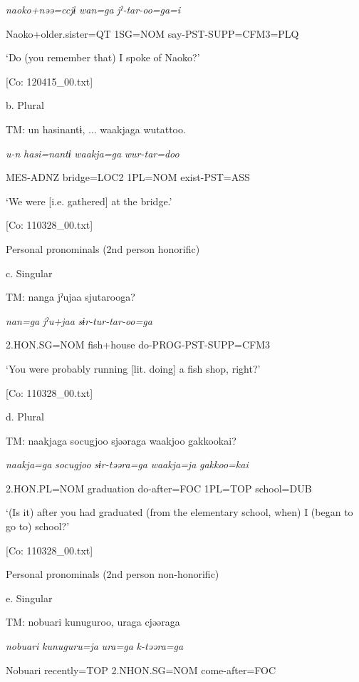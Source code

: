       \textit{naoko+nəə=ccjɨ}  \textit{wan=ga}  \textit{jˀ-tar-oo=ga=i}

      Naoko+older.sister=QT  1SG=NOM  say-PST-SUPP=CFM3=PLQ

      ‘Do (you remember that) I spoke of Naoko?’

      [Co: 120415\_00.txt]

  b.  Plural

    TM:  un  hasinantɨ, ...  waakjaga  wutattoo.

      \textit{u-n}  \textit{hasi=nantɨ}  \textit{waakja=ga}  \textit{wur-tar=doo}

      MES-ADNZ  bridge=LOC2  1PL=NOM  exist-PST=ASS

      ‘We were [i.e. gathered] at the bridge.’

      [Co: 110328\_00.txt]

  Personal pronominals (2nd person honorific)

  c.  Singular

    TM:  nanga  jˀujaa  sjutarooga?

      \textit{nan=ga}  \textit{jˀu+jaa}  \textit{sɨr-tur-tar-oo=ga}

      2.HON.SG=NOM  fish+house  do-PROG-PST-SUPP=CFM3

      ‘You were probably running [lit. doing] a fish shop, right?’

      [Co: 110328\_00.txt]

  d.  Plural

    TM:  naakjaga  {\textbar}socugjoo{\textbar}  sjəəraga  waakjoo  {\textbar}gakkoo{\textbar}kai?

      \textit{naakja=ga}  \textit{socugjoo}  \textit{sɨr-təəra=ga}  \textit{waakja=ja}  \textit{gakkoo=kai}

      2.HON.PL=NOM  graduation  do-after=FOC  1PL=TOP  school=DUB

      ‘(Is it) after you had graduated (from the elementary school, when) I (began to go to) school?’

      [Co: 110328\_00.txt]

  Personal pronominals (2nd person non-honorific)

  e.  Singular

    TM:  nobuari  kunuguroo,  uraga  cjəəraga

      \textit{nobuari}  \textit{kunuguru=ja}  \textit{ura=ga}  \textit{k-təəra=ga}

      Nobuari  recently=TOP  2.NHON.SG=NOM  come-after=FOC

